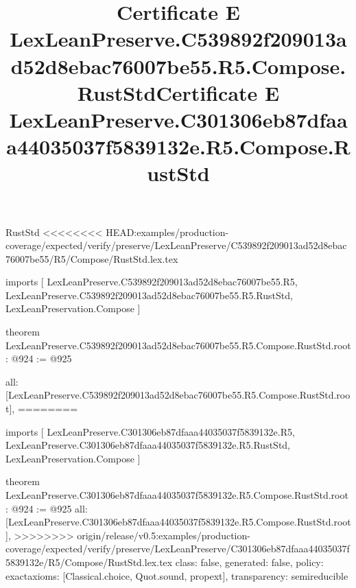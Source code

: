 \begin{lexlean}{RustStd}
<<<<<<<< HEAD:examples/production-coverage/expected/verify/preserve/LexLeanPreserve/C539892f209013ad52d8ebac76007be55/R5/Compose/RustStd.lex.tex
\title{Certificate E LexLeanPreserve.C539892f209013ad52d8ebac76007be55.R5.Compose.RustStd}
\begin{coremodule}
imports [
  LexLeanPreserve.C539892f209013ad52d8ebac76007be55.R5,
  LexLeanPreserve.C539892f209013ad52d8ebac76007be55.R5.RustStd,
  LexLeanPreservation.Compose
]

theorem LexLeanPreserve.C539892f209013ad52d8ebac76007be55.R5.Compose.RustStd.root : @924 := @925 {
  all: [LexLeanPreserve.C539892f209013ad52d8ebac76007be55.R5.Compose.RustStd.root],
========
\title{Certificate E LexLeanPreserve.C301306eb87dfaaa44035037f5839132e.R5.Compose.RustStd}
\begin{coremodule}
imports [
  LexLeanPreserve.C301306eb87dfaaa44035037f5839132e.R5,
  LexLeanPreserve.C301306eb87dfaaa44035037f5839132e.R5.RustStd,
  LexLeanPreservation.Compose
]

theorem LexLeanPreserve.C301306eb87dfaaa44035037f5839132e.R5.Compose.RustStd.root : @924 := @925 {
  all: [LexLeanPreserve.C301306eb87dfaaa44035037f5839132e.R5.Compose.RustStd.root],
>>>>>>>> origin/release/v0.5:examples/production-coverage/expected/verify/preserve/LexLeanPreserve/C301306eb87dfaaa44035037f5839132e/R5/Compose/RustStd.lex.tex
  class: false,
  generated: false,
  policy: exact{axioms: [Classical.choice, Quot.sound, propext]},
  transparency: semireducible
}


\end{coremodule}}
\end{coremodule}
\end{lexlean}
